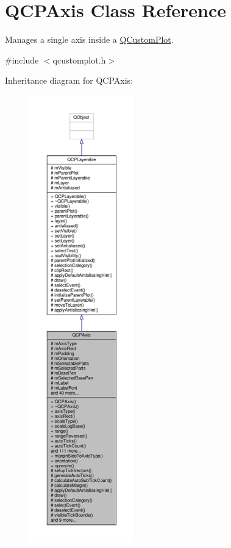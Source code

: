\hypertarget{class_q_c_p_axis}{}\section{Q\+C\+P\+Axis Class Reference}
\label{class_q_c_p_axis}


Manages a single axis inside a \hyperlink{class_q_custom_plot}{Q\+Custom\+Plot}.  




{\ttfamily \#include $<$qcustomplot.\+h$>$}



Inheritance diagram for Q\+C\+P\+Axis\+:\nopagebreak
\begin{figure}[H]
\begin{center}
\leavevmode
\includegraphics[height=550pt]{class_q_c_p_axis__inherit__graph}
\end{center}
\end{figure}


